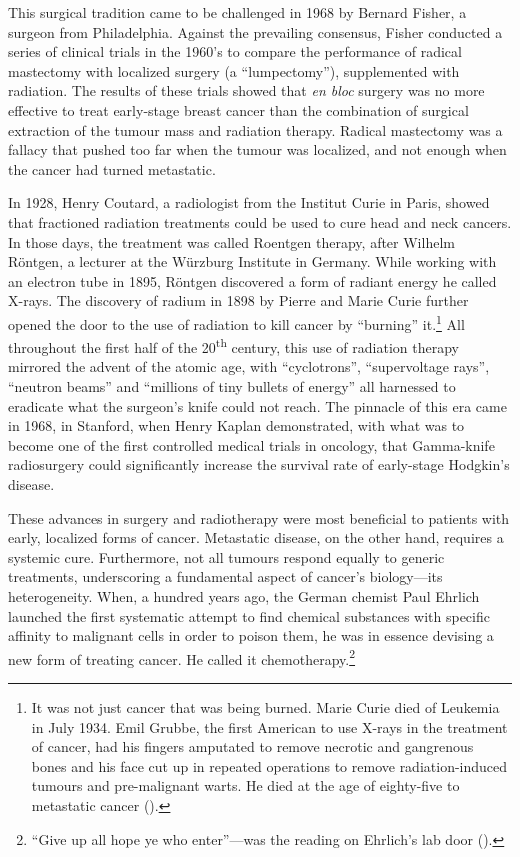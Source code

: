 This surgical tradition came to be challenged in 1968 by Bernard Fisher, a
surgeon from Philadelphia.  Against the prevailing consensus, Fisher conducted a
series of clinical trials in the 1960's to compare the performance of radical
mastectomy with localized surgery (a ``lumpectomy''), supplemented with
radiation.  The results of these trials showed that \emph{en bloc} surgery was
no more effective to treat early-stage breast cancer than the combination of
surgical extraction of the tumour mass and radiation
therapy.\cite{fisher_five-year_1985,fisher_ten-year_1985} Radical mastectomy was
a fallacy that pushed too far when the tumour was localized, and not enough when
the cancer had turned metastatic.

In 1928, Henry Coutard, a radiologist from the Institut Curie in Paris, showed
that fractioned radiation treatments could be used to cure head and neck
cancers.\cite{coutard_roentgen_1932} In those days, the treatment was called
Roentgen therapy, after Wilhelm Röntgen, a lecturer at the Würzburg Institute in
Germany.  While working with an electron tube in 1895, Röntgen discovered a form
of radiant energy he called X-rays.  The discovery of radium in 1898 by Pierre
and Marie Curie further opened the door to the use of radiation to kill cancer
by ``burning'' it.\footnote{It was not just cancer that was being burned.  Marie
  Curie died of Leukemia in July 1934.  Emil Grubbe, the first American to use
  X-rays in the treatment of cancer, had his fingers amputated to remove
  necrotic and gangrenous bones and his face cut up in repeated operations to
  remove \mbox{radiation-induced} tumours and \mbox{pre-malignant} warts. He
  died at the age of eighty-five to metastatic cancer
  (\citealp{mukherjee_emperor_2011}).}  All throughout the first half of the
20\textsuperscript{th} century, this use of radiation therapy mirrored the
advent of the atomic age, with ``cyclotrons'', ``supervoltage rays'', ``neutron
beams'' and ``millions of tiny bullets of energy'' all harnessed to eradicate
what the surgeon's knife could not reach.\cite{mukherjee_emperor_2011} The
pinnacle of this era came in 1968, in Stanford, when Henry Kaplan demonstrated,
with what was to become one of the first controlled medical trials in oncology,
that \mbox{Gamma-knife} radiosurgery could significantly increase the survival
rate of early-stage Hodgkin's disease.\cite{kaplan_clinical_1968}

These advances in surgery and radiotherapy were most beneficial to patients with
early, localized forms of cancer.  Metastatic disease, on the other hand,
requires a systemic cure.  Furthermore, not all tumours respond equally to
generic treatments, underscoring a fundamental aspect of cancer's biology---its
heterogeneity.  When, a hundred years ago, the German chemist Paul Ehrlich
launched the first systematic attempt to find chemical substances with specific
affinity to malignant cells in order to poison them, he was in essence devising
a new form of treating cancer. He called it chemotherapy.\footnote{``Give up all
  hope ye who enter''---was the reading on Ehrlich's lab door
  (\citealp{devita_history_2008}).}

